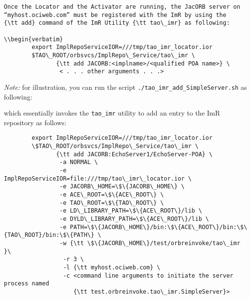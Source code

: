 \begin{itemize}
{\begin{itemize}
{{\begin{verbatim}
Once the Locator and the Activator are running, the JacORB server on 
“myhost.ociweb.com” must be registered with the ImR by using the 
{\tt add} command of the ImR Utility {\tt tao\_imr} as following:

\\begin{verbatim}
        export ImplRepoServiceIOR=///tmp/tao_imr_locator.ior
        $TAO\_ROOT/orbsvcs/ImplRepo\_Service/tao\_imr \
               {\tt add JACORB:<implname>/<qualified POA name>} \
                < . . . other arguments . . .>
 \end{verbatim}

\emph{Note:} for illustration, you can run the script 
{\tt ./tao\_imr\_add\_SimpleServer.sh} as following:


which essentially invokes the {\tt tao\_imr} utility to add an entry to 
the ImR repository as follows:

\begin{verbatim}
        export ImplRepoServiceIOR=///tmp/tao_imr_locator.ior
        \$TAO\_ROOT/orbsvcs/ImplRepo\_Service/tao\_imr \
               {\tt add JACORB:EchoServer1/EchoServer-POA} \
                -a NORMAL \
                -e ImplRepoServiceIOR=file:///tmp/tao\_imr\_locator.ior \
                -e JACORB\_HOME=\$\{JACORB\_HOME\} \
                -e ACE\_ROOT=\$\{ACE\_ROOT\} \
                -e TAO\_ROOT=\$\{TAO\_ROOT\} \
                -e LD\_LIBRARY_PATH=\$\{ACE\_ROOT\}/lib \
                -e DYLD\_LIBRARY_PATH=\$\{ACE\_ROOT\}/lib \
                -e PATH=\$\{JACORB\_HOME\}/bin:\$\{ACE\_ROOT\}/bin:\$\{TAO\_ROOT}/bin:\$\{PATH\} \
                -w {\tt \$\{JACORB\_HOME\}/test/orbreinvoke/tao\_imr }\
                 -r 3 \
                 -l {\tt myhost.ociweb.com} \
                 -c <command line arguments to initiate the server process named
                    {\tt test.orbreinvoke.tao\_imr.SimpleServer}>
\end{verbatim}

}}
\end{itemize}}
\end{itemize}
